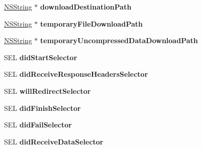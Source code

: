 \begin{DoxyCompactItemize}
\item 
\hypertarget{interface_a_s_i_h_t_t_p_request_ae9953b505204ca1fa8b9902b07b3fd6b}{
\hyperlink{class_n_s_string}{\-N\-S\-String} $\ast$ {\bfseries download\-Destination\-Path}}
\label{interface_a_s_i_h_t_t_p_request_ae9953b505204ca1fa8b9902b07b3fd6b}

\item 
\hypertarget{interface_a_s_i_h_t_t_p_request_aba4dfe6a9c10b051bd56802207c5eb1c}{
\hyperlink{class_n_s_string}{\-N\-S\-String} $\ast$ {\bfseries temporary\-File\-Download\-Path}}
\label{interface_a_s_i_h_t_t_p_request_aba4dfe6a9c10b051bd56802207c5eb1c}

\item 
\hypertarget{interface_a_s_i_h_t_t_p_request_a8b3a7f6cfae5bc139f2f6e96cb631144}{
\hyperlink{class_n_s_string}{\-N\-S\-String} $\ast$ {\bfseries temporary\-Uncompressed\-Data\-Download\-Path}}
\label{interface_a_s_i_h_t_t_p_request_a8b3a7f6cfae5bc139f2f6e96cb631144}

\item 
\hypertarget{interface_a_s_i_h_t_t_p_request_a3c452ff6acd738d224fd2a3d229404f3}{
\-S\-E\-L {\bfseries did\-Start\-Selector}}
\label{interface_a_s_i_h_t_t_p_request_a3c452ff6acd738d224fd2a3d229404f3}

\item 
\hypertarget{interface_a_s_i_h_t_t_p_request_a4c3322b6334c695f2bc84470f40caa29}{
\-S\-E\-L {\bfseries did\-Receive\-Response\-Headers\-Selector}}
\label{interface_a_s_i_h_t_t_p_request_a4c3322b6334c695f2bc84470f40caa29}

\item 
\hypertarget{interface_a_s_i_h_t_t_p_request_aca68fb77dce081b88e0be754a43e3cbc}{
\-S\-E\-L {\bfseries will\-Redirect\-Selector}}
\label{interface_a_s_i_h_t_t_p_request_aca68fb77dce081b88e0be754a43e3cbc}

\item 
\hypertarget{interface_a_s_i_h_t_t_p_request_ae97a5625e9b45c388420da65f4dc87b7}{
\-S\-E\-L {\bfseries did\-Finish\-Selector}}
\label{interface_a_s_i_h_t_t_p_request_ae97a5625e9b45c388420da65f4dc87b7}

\item 
\hypertarget{interface_a_s_i_h_t_t_p_request_a1914f985ef9011b2d8343bc620e91d7e}{
\-S\-E\-L {\bfseries did\-Fail\-Selector}}
\label{interface_a_s_i_h_t_t_p_request_a1914f985ef9011b2d8343bc620e91d7e}

\item 
\hypertarget{interface_a_s_i_h_t_t_p_request_a42d80669376d260add721bebeaec1b4e}{
\-S\-E\-L {\bfseries did\-Receive\-Data\-Selector}}
\label{interface_a_s_i_h_t_t_p_request_a42d80669376d260add721bebeaec1b4e}


\end{DoxyCompactItemize}
